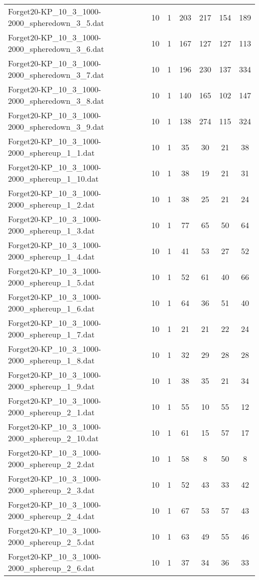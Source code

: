 \begin{table}[!ht]
\begin{tabular}{lcccccc}
Forget20-KP\_10\_3\_1000-2000\_spheredown\_3\_5.dat & 10 & 1 & 203 & 217 & 154 & 189 \\
Forget20-KP\_10\_3\_1000-2000\_spheredown\_3\_6.dat & 10 & 1 & 167 & 127 & 127 & 113 \\
Forget20-KP\_10\_3\_1000-2000\_spheredown\_3\_7.dat & 10 & 1 & 196 & 230 & 137 & 334 \\
Forget20-KP\_10\_3\_1000-2000\_spheredown\_3\_8.dat & 10 & 1 & 140 & 165 & 102 & 147 \\
Forget20-KP\_10\_3\_1000-2000\_spheredown\_3\_9.dat & 10 & 1 & 138 & 274 & 115 & 324 \\
Forget20-KP\_10\_3\_1000-2000\_sphereup\_1\_1.dat & 10 & 1 & 35 & 30 & 21 & 38 \\
Forget20-KP\_10\_3\_1000-2000\_sphereup\_1\_10.dat & 10 & 1 & 38 & 19 & 21 & 31 \\
Forget20-KP\_10\_3\_1000-2000\_sphereup\_1\_2.dat & 10 & 1 & 38 & 25 & 21 & 24 \\
Forget20-KP\_10\_3\_1000-2000\_sphereup\_1\_3.dat & 10 & 1 & 77 & 65 & 50 & 64 \\
Forget20-KP\_10\_3\_1000-2000\_sphereup\_1\_4.dat & 10 & 1 & 41 & 53 & 27 & 52 \\
Forget20-KP\_10\_3\_1000-2000\_sphereup\_1\_5.dat & 10 & 1 & 52 & 61 & 40 & 66 \\
Forget20-KP\_10\_3\_1000-2000\_sphereup\_1\_6.dat & 10 & 1 & 64 & 36 & 51 & 40 \\
Forget20-KP\_10\_3\_1000-2000\_sphereup\_1\_7.dat & 10 & 1 & 21 & 21 & 22 & 24 \\
Forget20-KP\_10\_3\_1000-2000\_sphereup\_1\_8.dat & 10 & 1 & 32 & 29 & 28 & 28 \\
Forget20-KP\_10\_3\_1000-2000\_sphereup\_1\_9.dat & 10 & 1 & 38 & 35 & 21 & 34 \\
Forget20-KP\_10\_3\_1000-2000\_sphereup\_2\_1.dat & 10 & 1 & 55 & 10 & 55 & 12 \\
Forget20-KP\_10\_3\_1000-2000\_sphereup\_2\_10.dat & 10 & 1 & 61 & 15 & 57 & 17 \\
Forget20-KP\_10\_3\_1000-2000\_sphereup\_2\_2.dat & 10 & 1 & 58 & 8 & 50 & 8 \\
Forget20-KP\_10\_3\_1000-2000\_sphereup\_2\_3.dat & 10 & 1 & 52 & 43 & 33 & 42 \\
Forget20-KP\_10\_3\_1000-2000\_sphereup\_2\_4.dat & 10 & 1 & 67 & 53 & 57 & 43 \\
Forget20-KP\_10\_3\_1000-2000\_sphereup\_2\_5.dat & 10 & 1 & 63 & 49 & 55 & 46 \\
Forget20-KP\_10\_3\_1000-2000\_sphereup\_2\_6.dat & 10 & 1 & 37 & 34 & 36 & 33 \\

\end{tabular}
\end{table}
